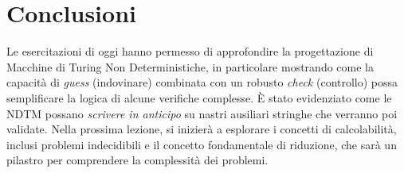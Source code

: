 \documentclass[a4paper]{article}
\begin{document}
\section{Conclusioni}
Le esercitazioni di oggi hanno permesso di approfondire la progettazione di Macchine di Turing Non Deterministiche, in particolare mostrando come la capacità di \textit{guess} (indovinare) combinata con un robusto \textit{check} (controllo) possa semplificare la logica di alcune verifiche complesse. È stato evidenziato come le NDTM possano \textit{scrivere in anticipo} su nastri ausiliari stringhe che verranno poi validate.
Nella prossima lezione, si inizierà a esplorare i concetti di calcolabilità, inclusi problemi indecidibili e il concetto fondamentale di riduzione, che sarà un pilastro per comprendere la complessità dei problemi.
\end{document}
